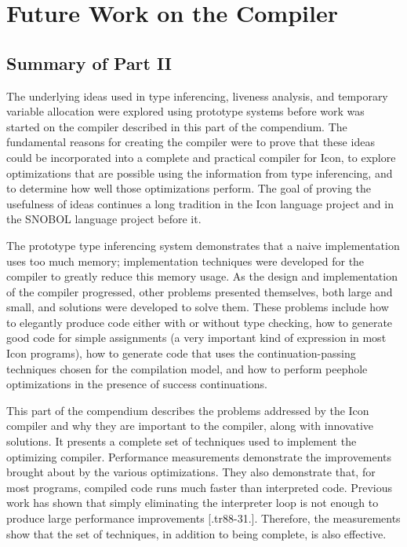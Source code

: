 \chapter{Future Work on the Compiler}

\section{Summary of Part II}

The underlying ideas used in type inferencing, liveness analysis, and
temporary variable allocation were explored using prototype systems
before work was started on the compiler described in this part of the
compendium. The fundamental reasons for creating the compiler were
to prove that these ideas could be incorporated into a complete and
practical compiler for Icon, to explore optimizations that are
possible using the information from type inferencing, and to determine
how well those optimizations perform. The goal of proving the
usefulness of ideas continues a long tradition in the Icon language
project and in the SNOBOL language project before it.

The prototype type inferencing system demonstrates that a naive
implementation uses too much memory; implementation techniques were
developed for the compiler to greatly reduce this memory usage. As the
design and implementation of the compiler progressed, other problems
presented themselves, both large and small, and solutions were
developed to solve them. These problems include how to elegantly
produce code either with or without type checking, how to generate
good code for simple assignments (a very important kind of expression
in most Icon programs), how to generate code that uses the
continuation-passing techniques chosen for the compilation model, and
how to perform peephole optimizations in the presence of success
continuations.

This part of the compendium describes the problems addressed by the Icon
compiler and why they are important to the compiler, along with
innovative solutions. It presents a complete set of techniques used to
implement the optimizing compiler.  Performance measurements
demonstrate the improvements brought about by the various
optimizations. They also demonstrate that, for most programs, compiled
code runs much faster than interpreted code. Previous work has shown
that simply eliminating the interpreter loop is not enough to produce
large performance improvements [.tr88-31.]. Therefore, the
measurements show that the set of techniques, in addition to being
complete, is also effective.


